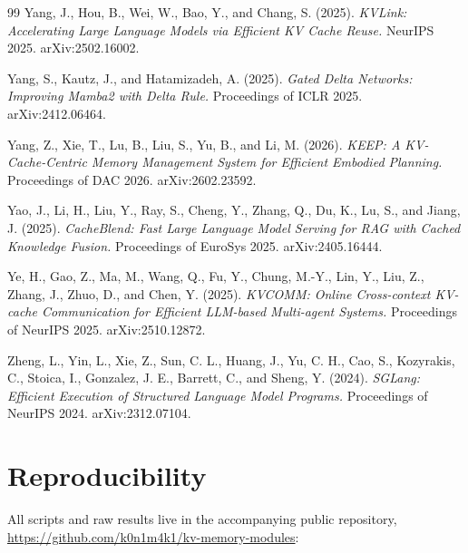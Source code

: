 \documentclass[11pt]{article}
\begin{document}
\begin{thebibliography}{99}
Yang, J., Hou, B., Wei, W., Bao, Y., and Chang, S. (2025).
\emph{KVLink: Accelerating Large Language Models via Efficient KV Cache Reuse.}
NeurIPS 2025. arXiv:2502.16002.

Yang, S., Kautz, J., and Hatamizadeh, A. (2025).
\emph{Gated Delta Networks: Improving Mamba2 with Delta Rule.}
Proceedings of ICLR 2025. arXiv:2412.06464.

Yang, Z., Xie, T., Lu, B., Liu, S., Yu, B., and Li, M. (2026).
\emph{KEEP: A KV-Cache-Centric Memory Management System for Efficient Embodied Planning.}
Proceedings of DAC 2026. arXiv:2602.23592.

Yao, J., Li, H., Liu, Y., Ray, S., Cheng, Y., Zhang, Q., Du, K., Lu, S., and Jiang, J. (2025).
\emph{CacheBlend: Fast Large Language Model Serving for RAG with Cached Knowledge Fusion.}
Proceedings of EuroSys 2025. arXiv:2405.16444.

Ye, H., Gao, Z., Ma, M., Wang, Q., Fu, Y., Chung, M.-Y., Lin, Y., Liu, Z., Zhang, J., Zhuo, D., and Chen, Y. (2025).
\emph{KVCOMM: Online Cross-context KV-cache Communication for Efficient LLM-based Multi-agent Systems.}
Proceedings of NeurIPS 2025. arXiv:2510.12872.

Zheng, L., Yin, L., Xie, Z., Sun, C. L., Huang, J., Yu, C. H., Cao, S., Kozyrakis, C., Stoica, I., Gonzalez, J. E., Barrett, C., and Sheng, Y. (2024).
\emph{SGLang: Efficient Execution of Structured Language Model Programs.}
Proceedings of NeurIPS 2024. arXiv:2312.07104.

\end{thebibliography}

\section*{Reproducibility}

All scripts and raw results live in the accompanying public repository, \url{https://github.com/k0n1m4k1/kv-memory-modules}:
\end{document}
